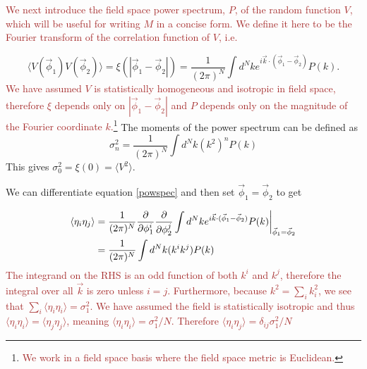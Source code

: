 \documentclass[12pt]{article}
\newcommand{\sh}[1]{\textcolor{brown}{#1}}
\begin{document}
\sh{We next introduce the field space power spectrum, $P$, of the random function $V$, which will be useful for writing $M$ in a concise form. We define it here to be the Fourier transform of the correlation function of $V$, i.e.}

\begin{equation}\label{powspec}
\langle V(\vec{\phi}_1) V(\vec{\phi}_2) \rangle = \xi(|\vec{\phi}_1-\vec{\phi}_2|)= \frac{1}{(2\pi)^N} \int d^Nk e^{i \vec{k} \cdot (\vec{\phi}_1-\vec{\phi}_2)} P(k).
\end{equation}
%
\sh{We have assumed $V$ is statistically homogeneous and isotropic in field space, therefore $\xi$ depends only on $|\vec{\phi}_1-\vec{\phi}_2|$ and  $P$ depends only on the magnitude of the Fourier coordinate $k$.\footnote{\sh{We work in a field space basis where the field space metric is Euclidean.}}} The moments of the power spectrum can be defined as
%
\begin{equation} \label{moments}
\sigma_n^2 = \frac{1}{(2\pi)^N}\int d^Nk (k^{2})^n P(k)
\end{equation}
%
This gives $\sigma_0^2=\xi(0)=\langle V^2 \rangle$.

We can differentiate equation \eqref{powspec} and then set $\vec{\phi}_1 = \vec{\phi}_2$ to get

\begin{align*}
\langle \eta_{i}\eta_{j}\rangle &= \frac{1}{(2\pi)^N} \frac{\partial}{\partial \phi_1^i}\frac{\partial}{\partial \phi_2^j} \int d^Nk e^{i \vec{k} \cdot (\vec{\phi}_1-\vec{\phi}_2)} P(k)\bigg{|}_{\vec{\phi}_1=\vec{\phi}_2}\\
&= \frac{1}{(2\pi)^N}\int d^Nk (k^i k^j) P(k)
\end{align*}
%
\sh{The integrand on the RHS is an odd function of both $k^i$ and $k^j$, therefore the integral over all $\vec{k}$ is zero unless $i=j$. Furthermore, because $k^2 = \sum_i k_i^2$, we see that $\sum_i \langle \eta_{i}\eta_{i}\rangle = \sigma_1^2$. We have assumed the field is statistically isotropic and thus $\langle \eta_{i}\eta_{i}\rangle=\langle \eta_{j}\eta_{j}\rangle$, meaning $\langle \eta_{i}\eta_{i}\rangle=\sigma_1^2/N$. Therefore $\langle \eta_{i}\eta_{j}\rangle=\delta_{ij}\sigma_1^2/N$}

\end{document}
